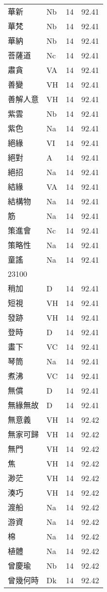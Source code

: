 \documentclass[twocolumn]{book}
\begin{document}
\begin{supertabular}{llrr}
華新 & Nb & 14 &  92.41\\
華梵 & Nb & 14 &  92.41\\
華納 & Nb & 14 &  92.41\\
菩薩道 & Nc & 14 &  92.41\\
肅貪 & VA & 14 &  92.41\\
善變 & VH & 14 &  92.41\\
善解人意 & VH & 14 &  92.41\\
紫雲 & Nb & 14 &  92.41\\
紫色 & Na & 14 &  92.41\\
絕緣 & VI & 14 &  92.41\\
絕對 & A & 14 &  92.41\\
絕招 & Na & 14 &  92.41\\
結緣 & VA & 14 &  92.41\\
結構物 & Na & 14 &  92.41\\
筋 & Na & 14 &  92.41\\
策進會 & Nc & 14 &  92.41\\
策略性 & Na & 14 &  92.41\\
童謠 & Na & 14 &  92.41\\
23100\\
稍加 & D & 14 &  92.41\\
短視 & VH & 14 &  92.41\\
發跡 & VH & 14 &  92.41\\
登時 & D & 14 &  92.41\\
畫下 & VC & 14 &  92.41\\
琴筒 & Na & 14 &  92.41\\
煮沸 & VC & 14 &  92.41\\
無償 & D & 14 &  92.41\\
無緣無故 & D & 14 &  92.41\\
無意義 & VH & 14 &  92.42\\
無家可歸 & VH & 14 &  92.42\\
無門 & VH & 14 &  92.42\\
焦 & VH & 14 &  92.42\\
渺茫 & VH & 14 &  92.42\\
湊巧 & VH & 14 &  92.42\\
渡船 & Na & 14 &  92.42\\
游資 & Na & 14 &  92.42\\
棉 & Na & 14 &  92.42\\
植體 & Na & 14 &  92.42\\
曾慶瑜 & Nb & 14 &  92.42\\
曾幾何時 & Dk & 14 &  92.42\\

\end{supertabular}
\end{document}
